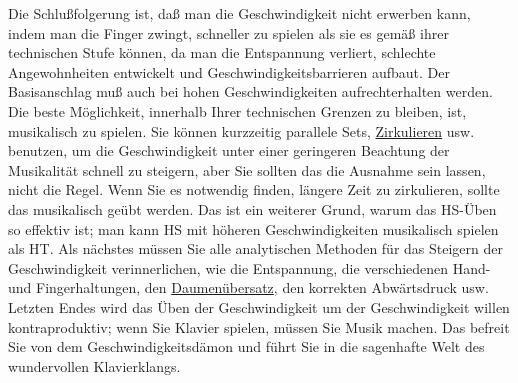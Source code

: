 Die Schlußfolgerung ist, daß man die Geschwindigkeit nicht erwerben kann, indem man die Finger zwingt, schneller zu spielen als sie es gemäß ihrer technischen Stufe können, da man die Entspannung verliert, schlechte Angewohnheiten entwickelt und Geschwindigkeitsbarrieren aufbaut.
Der Basisanschlag muß auch bei hohen Geschwindigkeiten aufrechterhalten werden.
Die beste Möglichkeit, innerhalb Ihrer technischen Grenzen zu bleiben, ist, musikalisch zu spielen.
Sie können kurzzeitig parallele Sets, \hyperlink{c1iii2}{Zirkulieren} usw. benutzen, um die Geschwindigkeit unter einer geringeren Beachtung der Musikalität schnell zu steigern, aber Sie sollten das die Ausnahme sein lassen, nicht die Regel.
Wenn Sie es notwendig finden, längere Zeit zu zirkulieren, sollte das musikalisch geübt werden.
Das ist ein weiterer Grund, warum das HS-Üben so effektiv ist; man kann HS mit höheren Geschwindigkeiten musikalisch spielen als HT.
Als nächstes müssen Sie alle analytischen Methoden für das Steigern der Geschwindigkeit verinnerlichen, wie die Entspannung, die verschiedenen Hand- und Fingerhaltungen, den \hyperlink{c1iii5b}{Daumenübersatz}, den korrekten Abwärtsdruck usw.
Letzten Endes wird das Üben der Geschwindigkeit um der Geschwindigkeit willen kontraproduktiv; wenn Sie Klavier spielen, müssen Sie Musik machen.
Das befreit Sie von dem Geschwindigkeitsdämon und führt Sie in die sagenhafte Welt des wundervollen Klavierklangs.



